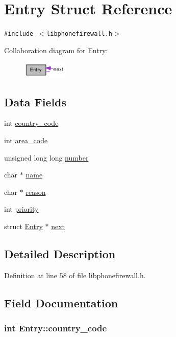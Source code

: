 \hypertarget{structEntry}{
\section{Entry Struct Reference}
\label{structEntry}
}
{\tt \#include $<$libphonefirewall.h$>$}

Collaboration diagram for Entry:\nopagebreak
\begin{figure}[H]
\begin{center}
\leavevmode
\includegraphics[width=61pt]{structEntry__coll__graph}
\end{center}
\end{figure}
\subsection*{Data Fields}
\begin{CompactItemize}
\item 
int \hyperlink{structEntry_138b4e79687ff5ff6de4554db0f061fd}{country\_\-code}
\item 
int \hyperlink{structEntry_9de7b96e5b65796bd35e9dc730dcd8b3}{area\_\-code}
\item 
unsigned long long \hyperlink{structEntry_1f2177afed89936f82c130ae13fb107c}{number}
\item 
char $\ast$ \hyperlink{structEntry_272e382d3efed5f970c7939742ec9603}{name}
\item 
char $\ast$ \hyperlink{structEntry_2082cdbb815dfa8b81309cd395d32986}{reason}
\item 
int \hyperlink{structEntry_85af261b3171c257892b54a7200da061}{priority}
\item 
struct \hyperlink{structEntry}{Entry} $\ast$ \hyperlink{structEntry_08cba741f383cd7da0f3ab9aee6e3cd5}{next}
\end{CompactItemize}


\subsection{Detailed Description}


Definition at line 58 of file libphonefirewall.h.

\subsection{Field Documentation}
\hypertarget{structEntry_138b4e79687ff5ff6de4554db0f061fd}{
\subsubsection{\setlength{\rightskip}{0pt plus 5cm}int {\bf Entry::country\_\-code}}}
\label{structEntry_138b4e79687ff5ff6de4554db0f061fd}




